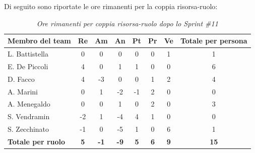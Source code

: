 ﻿\documentclass[a4paper, 10pt, colorlinks=true, linkcolor=black, urlcolor=blue, citecolor=blue, hidelinks]{article}
\renewcommand{\arraystretch}{1.2}
\begin{document}
Di seguito sono riportate le ore rimanenti per la coppia risorsa-ruolo:

\begin{table}[H]
    \centering
    \renewcommand{\arraystretch}{1.4}
    \begin{tabular}{|l|c|c|c|c|c|c|c|}
        \hline
        \rowcolor{bluBitless!15}
        \textbf{Membro del team} & \textbf{Re} & \textbf{Am} & \textbf{An} & \textbf{Pt} & \textbf{Pr} & \textbf{Ve} & \textbf{Totale per persona} \\
        \hline
        L. Battistella & 0 & 0 & 0 & 0 & 0 & 1 & 1 \\ \hline
        E. De Piccoli & 4 & 0 & 1 & 1 & 0 & 0 & 6 \\ \hline
        D. Facco & 4 & -3 & 0 & 0 & 1 & 2 & 4 \\ \hline
        A. Marini & 0 & 1 & -2 & -1 & 2 & 0 & 0 \\ \hline
        A. Menegaldo & 0 & 0 & 1 & 0 & 2 & 0 & 3 \\ \hline
        S. Vendramin & -2 & 1 & -4 & 4 & 1 & 0 & 0 \\ \hline
        S. Zecchinato & -1 & 0 & -5 & 1 & 0 & 6 & 1 \\ \hline
        \rowcolor{bluBitless!8}
        \textbf{Totale per ruolo} & \textbf{5} & \textbf{-1} & \textbf{-9} & \textbf{5} & \textbf{6} & \textbf{9} & \textbf{15} \\
        \hline
    \end{tabular}
    \caption{\textit{Ore rimanenti per coppia risorsa-ruolo dopo lo Sprint \#11}}
\end{table}
\end{document}
